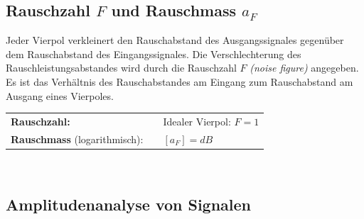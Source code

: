 	
	\subsection{Rauschzahl $F$ und Rauschmass $a_F$ }
	
		Jeder Vierpol verkleinert den Rauschabstand des Ausgangssignales gegenüber dem Rauschabstand des Eingangssignales.
		Die Verschlechterung des Rauschleistungsabstandes wird durch die Rauschzahl $F$ \textit{(noise figure)} angegeben.
		Es ist das Verhältnis des Rauschabstandes am Eingang zum Rauschabstand am Ausgang eines Vierpoles.\\
		
		\begin{tabular}{lll}
			\textbf{Rauschzahl:}
		&	\fbox{$F 	= \dfrac{\text{SNR}_{Eingang}}{\text{SNR}_{Ausgang}}
						= \dfrac{\frac{P_{sEingang}}{P_{rEingang}}}{\frac{P_{sAusgang}}{P_{rAusgang}}} 
						= \frac{P_{sEingang}}{P_{rEingang}} \cdot \frac{P_{rAusgang}}{P_{sAusgang}}$}
		&	Idealer Vierpol: $F = 1$
		\\
			\textbf{Rauschmass} (logarithmisch):
		&	\formel{$a_F = 10 \cdot log_{10} (F) = a_{rEingang} - a_{rAusgang}$}
		&	$[a_F] = dB$
		\end{tabular}\\
	
	\subsection{Amplitudenanalyse von Signalen }
	
